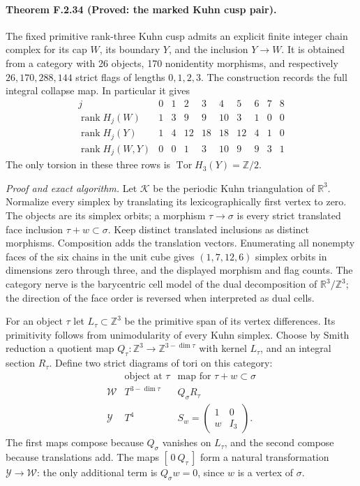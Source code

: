 \paragraph{Theorem F.2.34 (Proved: the marked Kuhn cusp pair).}
The fixed primitive rank-three Kuhn cusp admits an explicit
finite integer chain complex for its cap $W$, its boundary
$Y$, and the inclusion $Y\to W$.  It is obtained from a
category with 26 objects, 170 nonidentity morphisms, and
respectively $26,170,288,144$ strict flags of lengths
$0,1,2,3$.  The construction records the full integral
collapse map.  In particular it gives
\[
\begin{array}{c|rrrrrrrrr}
j&0&1&2&3&4&5&6&7&8\\\hline
\operatorname{rank}H_j(W)&1&3&9&9&10&3&1&0&0\\
\operatorname{rank}H_j(Y)&1&4&12&18&18&12&4&1&0\\
\operatorname{rank}H_j(W,Y)&0&0&1&3&10&9&9&3&1
\end{array}                                                \tag{F.CK1}
\]
The only torsion in these three rows is
$\operatorname{Tor}H_3(Y)=\mathbb Z/2$.

\emph{Proof and exact algorithm.}
Let $\mathcal K$ be the periodic Kuhn triangulation of
$\mathbb R^3$.  Normalize every simplex by translating its
lexicographically first vertex to zero.  The objects are its
simplex orbits; a morphism $\tau\to\sigma$ is every strict
translated face inclusion $\tau+w\subset\sigma$.
Keep distinct translated inclusions as distinct morphisms.
Composition adds the translation vectors.  Enumerating all
nonempty faces of the six chains in the unit cube gives
$(1,7,12,6)$ simplex orbits in dimensions zero through three,
and the displayed morphism and flag counts.  The category
nerve is the barycentric cell model of the dual decomposition
of $\mathbb R^3/\mathbb Z^3$; the direction of the face order
is reversed when interpreted as dual cells.

For an object $\tau$ let $L_\tau\subset\mathbb Z^3$ be the
primitive span of its vertex differences.  Its primitivity
follows from unimodularity of every Kuhn simplex.  Choose by
Smith reduction a quotient map
$Q_\tau:\mathbb Z^3\to\mathbb Z^{3-\dim\tau}$ with kernel
$L_\tau$, and an integral section $R_\tau$.
Define two strict diagrams of tori on this category:
\[
\begin{array}{c|c|c}
 &\text{object at }\tau&\text{map for }\tau+w\subset\sigma\\\hline
\mathcal W&T^{3-\dim\tau}&Q_\sigma R_\tau\\
\mathcal Y&T^4&S_w=\begin{pmatrix}1&0\\ w&I_3\end{pmatrix}.
\end{array}                                                \tag{F.CK2}
\]
The first maps compose because $Q_\sigma$ vanishes on
$L_\tau$, and the second compose because translations add.
The maps $[\,0\ Q_\tau\,]$ form a natural transformation
$\mathcal Y\to\mathcal W$: the only additional term is
$Q_\sigma w=0$, since $w$ is a vertex of $\sigma$.

